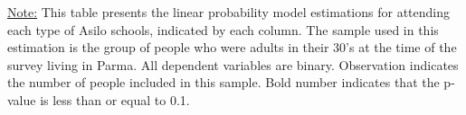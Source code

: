 \begin{footnotesize}
\noindent\underline{Note:} This table presents the linear probability model estimations for attending each type of Asilo schools, indicated by each column. The sample used in this estimation is the group of people who were adults in their 30's at the time of the survey living in Parma. All dependent variables are binary. Observation indicates the number of people included in this sample. Bold number indicates that the p-value is less than or equal to 0.1.
\end{footnotesize}
